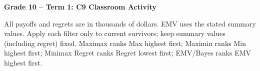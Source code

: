 \makeatletter
{}
\makeatother

\pagestyle{empty}
\newcommand{\worklines}{\par\vspace{3mm}\hrule\vspace{4mm}\hrule\vspace{2mm}}
\newenvironment{studentproblem}{\par\addvspace{4pt}\noindent\begin{minipage}{\linewidth}}{\end{minipage}\par}
\newcommand{\filterblank}{\rule{0pt}{5mm}\rule{\linewidth}{0.4pt}}

\begingroup\renewcommand{\baselinestretch}{1}\small
\setlength{\parskip}{2pt}\makeatletter\edef{}\makeatother
\begin{center}{\large\bfseries Grade 10 -- Term 1: C9 Classroom Activity}\end{center}



\noindent All payoffs and regrets are in thousands of dollars. EMV uses the stated summary values.
Apply each filter only to current survivors; keep summary values (including regret) fixed.
Maximax ranks Max highest first; Maximin ranks Min highest first; Minimax Regret ranks Regret lowest first; EMV/Bayes ranks EMV highest first.


